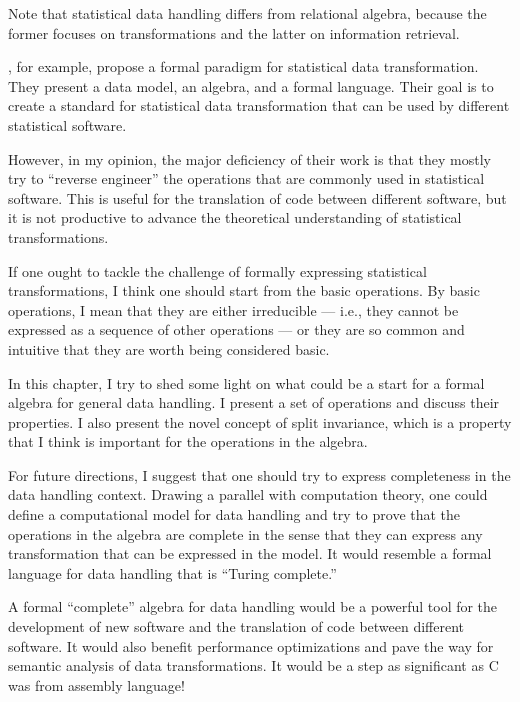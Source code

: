 Note that statistical data handling differs from relational algebra, because the former focuses
on transformations and the latter on information retrieval.

\textcite{Song2021}, for example, propose a formal paradigm for statistical data
transformation.  They present a data model, an algebra, and a formal language.  Their goal
is to create a standard for statistical data transformation that can be used by different
statistical software.

However, in my opinion, the major deficiency of their work is that they mostly try to
``reverse engineer'' the operations that are commonly used in statistical software.  This
is useful for the translation of code between different software, but it is not productive
to advance the theoretical understanding of statistical transformations.

If one ought to tackle the challenge of formally expressing statistical transformations, I
think one should start from the basic operations.  By basic operations, I mean that they
are either irreducible --- i.e., they cannot be expressed as a sequence of other
operations --- or they are so common and intuitive that they are worth being considered
basic.

In this chapter, I try to shed some light on what could be a start for a formal algebra
for general data handling.  I present a set of operations and discuss their properties. I
also present the novel concept of split invariance, which is a property that I think is
important for the operations in the algebra.

For future directions, I suggest that one should try to express completeness in the data
handling context.  Drawing a parallel with computation theory, one could define a
computational model for data handling and try to prove that the operations in the algebra
are complete in the sense that they can express any transformation that can be expressed
in the model.  It would resemble a formal language for data handling that is ``Turing
complete.''

A formal ``complete'' algebra for data handling would be a powerful tool for the
development of new software and the translation of code between different software.  It
would also benefit performance optimizations and pave the way for semantic analysis of
data transformations.  It would be a step as significant as C was from assembly language!

